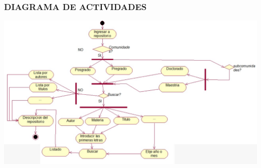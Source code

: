 \subsubsection{DIAGRAMA DE ACTIVIDADES}
\begin{center}
\includegraphics[width=18cm]{./Imagenes/diagramaactividades}
\end{center}